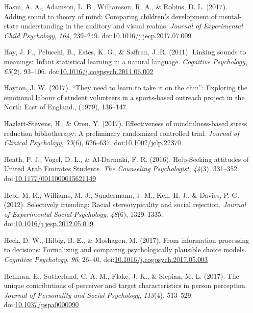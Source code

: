 \documentclass[english,man]{apa6}
\theoremstyle{definition}
\theoremstyle{definition}
\theoremstyle{definition}
\theoremstyle{remark}
\begin{document}
\hypertarget{ref-Hasni2017}{}
Hasni, A. A., Adamson, L. B., Williamson, R. A., \& Robins, D. L.
(2017). Adding sound to theory of mind: Comparing children's development
of mental-state understanding in the auditory and visual realms.
\emph{Journal of Experimental Child Psychology}, \emph{164}, 239--249.
doi:\href{https://doi.org/10.1016/j.jecp.2017.07.009}{10.1016/j.jecp.2017.07.009}

\hypertarget{ref-Hay2011}{}
Hay, J. F., Pelucchi, B., Estes, K. G., \& Saffran, J. R. (2011).
Linking sounds to meanings: Infant statistical learning in a natural
language. \emph{Cognitive Psychology}, \emph{63}(2), 93--106.
doi:\href{https://doi.org/10.1016/j.cogpsych.2011.06.002}{10.1016/j.cogpsych.2011.06.002}

\hypertarget{ref-Hayton2017}{}
Hayton, J. W. (2017). ``They need to learn to take it on the chin'':
Exploring the emotional labour of student volunteers in a sports-based
outreach project in the North East of England., (1979), 136--147.

\hypertarget{ref-Hazlett-Stevens2017}{}
Hazlett-Stevens, H., \& Oren, Y. (2017). Effectiveness of
mindfulness-based stress reduction bibliotherapy: A preliminary
randomized controlled trial. \emph{Journal of Clinical Psychology},
\emph{73}(6), 626--637.
doi:\href{https://doi.org/10.1002/jclp.22370}{10.1002/jclp.22370}

\hypertarget{ref-Heath2016}{}
Heath, P. J., Vogel, D. L., \& Al-Darmaki, F. R. (2016). Help-Seeking
attitudes of United Arab Emirates Students. \emph{The Counseling
Psychologist}, \emph{44}(3), 331--352.
doi:\href{https://doi.org/10.1177/0011000015621149}{10.1177/0011000015621149}

\hypertarget{ref-Hebl2012}{}
Hebl, M. R., Williams, M. J., Sundermann, J. M., Kell, H. J., \& Davies,
P. G. (2012). Selectively friending: Racial stereotypicality and social
rejection. \emph{Journal of Experimental Social Psychology},
\emph{48}(6), 1329--1335.
doi:\href{https://doi.org/10.1016/j.jesp.2012.05.019}{10.1016/j.jesp.2012.05.019}

\hypertarget{ref-Heck2017}{}
Heck, D. W., Hilbig, B. E., \& Moshagen, M. (2017). From information
processing to decisions: Formalizing and comparing psychologically
plausible choice models. \emph{Cognitive Psychology}, \emph{96}, 26--40.
doi:\href{https://doi.org/10.1016/j.cogpsych.2017.05.003}{10.1016/j.cogpsych.2017.05.003}

\hypertarget{ref-Hehman2017}{}
Hehman, E., Sutherland, C. A. M., Flake, J. K., \& Slepian, M. L.
(2017). The unique contributions of perceiver and target characteristics
in person perception. \emph{Journal of Personality and Social
Psychology}, \emph{113}(4), 513--529.
doi:\href{https://doi.org/10.1037/pspa0000090}{10.1037/pspa0000090}
\end{document}
